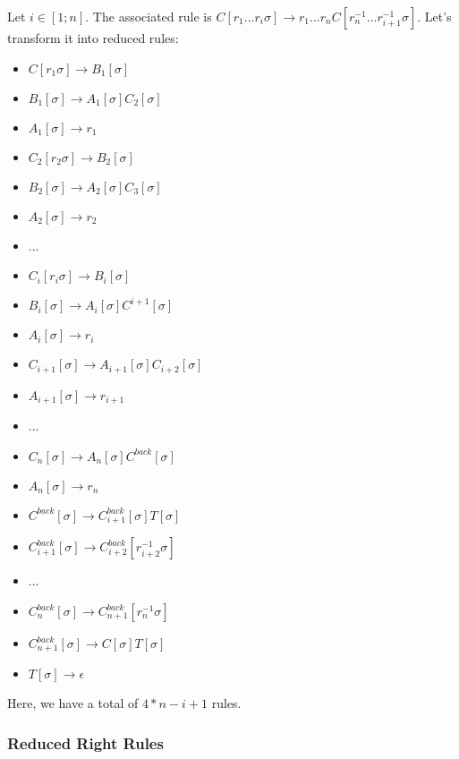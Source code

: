 \documentclass[10pt,a4paper,draft]{article}
\begin{document}
Let $i \in [1; n]$. The associated rule is $C[r_1...r_i \sigma] \rightarrow r_1 ... r_n C[r_n^{-1}...r_{i+1}^{-1} \sigma]$. Let's transform it into reduced rules:
\begin{itemize}
\item $C[r_1 \sigma] \rightarrow B_1[\sigma]$
\item $B_1[\sigma] \rightarrow A_1[\sigma] C_2[\sigma]$
\item $A_1[\sigma] \rightarrow r_1$
\item $C_2[r_2 \sigma] \rightarrow B_2[\sigma]$
\item $B_2[\sigma] \rightarrow A_2[\sigma] C_3[\sigma]$
\item $A_2[\sigma] \rightarrow r_2$
\item ...
\item $C_i[r_i \sigma] \rightarrow B_i[\sigma]$
\item $B_i[\sigma] \rightarrow A_i[\sigma] C^{i+1}[\sigma]$
\item $A_i[\sigma] \rightarrow r_i$
\item $C_{i+1}[\sigma] \rightarrow A_{i+1}[\sigma] C_{i+2}[\sigma]$
\item $A_{i+1}[\sigma] \rightarrow r_{i+1}$
\item ...
\item $C_n[\sigma] \rightarrow A_n[\sigma] C^{back}[\sigma]$
\item $A_n[\sigma] \rightarrow r_n$
\item $C^{back}[\sigma] \rightarrow C^{back}_{i+1}[\sigma] T[\sigma]$
\item $C_{i+1}^{back}[\sigma] \rightarrow C^{back}_{i+2}[r^{-1}_{i+2} \sigma]$
\item ...
\item $C_{n}^{back}[\sigma] \rightarrow C^{back}_{n+1}[r^{-1}_{n} \sigma]$
\item $C^{back}_{n+1}[\sigma] \rightarrow C[\sigma] T[\sigma]$
\item $T[\sigma] \rightarrow \epsilon$
\end{itemize}

Here, we have a total of $4 * n - i + 1$ rules.

\subsubsection{Reduced Right Rules}
\label{reducedrightrules}
\end{document}
